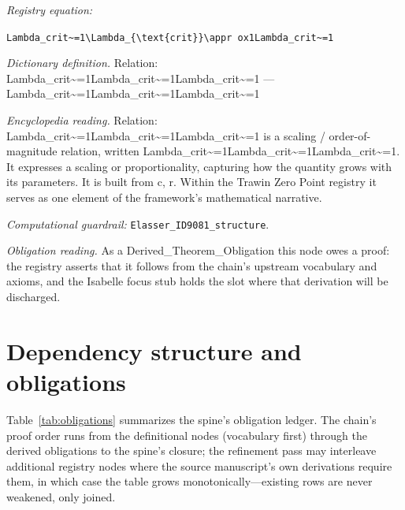\documentclass[11pt]{article}
\theoremstyle{remark}
\begin{document}
\noindent\textit{Registry equation:}\par
{\small\texttt{Lambda\_crit\textasciitilde{}=1\textbackslash{}Lambda\_\{\textbackslash{}text\{crit\}\}\textbackslash{}appr ox1Lambda\_crit\textasciitilde{}=1}}\par\medskip
\noindent\textit{Dictionary definition.} Relation: Lambda\_crit\textasciitilde{}=1Lambda\_crit\textasciitilde{}=1Lambda\_crit\textasciitilde{}=1 --- Lambda\_crit\textasciitilde{}=1Lambda\_crit\textasciitilde{}=1Lambda\_crit\textasciitilde{}=1\par\medskip
\noindent\textit{Encyclopedia reading.} Relation: Lambda\_crit\textasciitilde{}=1Lambda\_crit\textasciitilde{}=1Lambda\_crit\textasciitilde{}=1 is a scaling / order-of-magnitude relation, written Lambda\_crit\textasciitilde{}=1Lambda\_crit\textasciitilde{}=1Lambda\_crit\textasciitilde{}=1. It expresses a scaling or proportionality, capturing how the quantity grows with its parameters. It is built from c, r. Within the Trawin Zero Point registry it serves as one element of the framework's mathematical narrative.
\par\medskip\noindent\textit{Computational guardrail:} \texttt{Elasser\_ID9081\_structure}.
\par\medskip\noindent\textit{Obligation reading.} As a Derived\_Theorem\_Obligation this node owes a proof: the registry asserts that it follows from the chain's upstream vocabulary and axioms, and the Isabelle focus stub holds the slot where that derivation will be discharged.

\section{Dependency structure and obligations}
\label{sec:dep}

Table~\ref{tab:obligations} summarizes the spine's obligation ledger. The chain's proof order runs from the definitional nodes (vocabulary first) through the derived obligations to the spine's closure; the refinement pass may interleave additional registry nodes where the source manuscript's own derivations require them, in which case the table grows monotonically---existing rows are never weakened, only joined.
\end{document}
